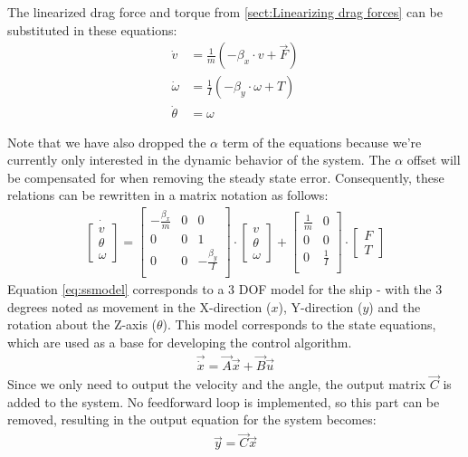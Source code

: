 The linearized drag force and torque from \ref{sect:Linearizing drag forces} can be substituted in these equations:
\begin{align}
 \dot{v} &= \frac{1}{m}(- \beta_{x} \cdot v + \vec{F})\\
 \dot{\omega} &= \frac{1}{I}(-\beta_{y} \cdot \omega + T)\\
 \dot{\theta} &= \omega
\end{align}

Note that we have also dropped the $ \alpha $ term of the equations because we're currently only interested in the dynamic behavior of the system. The $ \alpha $ offset will be compensated for when removing the steady state error. Consequently, these relations can be rewritten in a matrix notation as follows:
\begin{align}
\dot{
	\begin{bmatrix}
	 v\\
	 \theta\\
	 \omega
	\end{bmatrix}
}
=
\begin{bmatrix}
 -\frac{\beta_{x}}{m} & 0 & 0\\
 0 & 0 & 1\\
 0 & 0 & - \frac{\beta_{y}}{I}\\
\end{bmatrix}
\cdot
\begin{bmatrix}
v\\
\theta\\
\omega
\end{bmatrix}
+
\begin{bmatrix}
\frac{1}{m} & 0\\
0 & 0\\
0 & \frac{1}{I}\\
\end{bmatrix}
\cdot
\begin{bmatrix}
F\\
T
\end{bmatrix}
\label{eq:ssmodel}
\end{align}
Equation \vref{eq:ssmodel} corresponds to a 3 \ac{DOF} model for the ship - with the 3 degrees noted as movement in the X-direction ($x$), Y-direction ($y$) and the rotation about the Z-axis ($\theta$). This model corresponds to the state equations, which are used as a base for developing the control algorithm.
\begin{align}
\vec{\dot{x}} = \vec{A}\vec{x} + \vec{B}\vec{u}
\end{align}
Since we only need to output the velocity and the angle, the output matrix $\vec{C}$ is added to the system. No feedforward loop is implemented, so this part can be removed, resulting in the output equation for the system becomes:
\begin{align}
\vec{y} = \vec{C}\vec{x}
\end{align}

